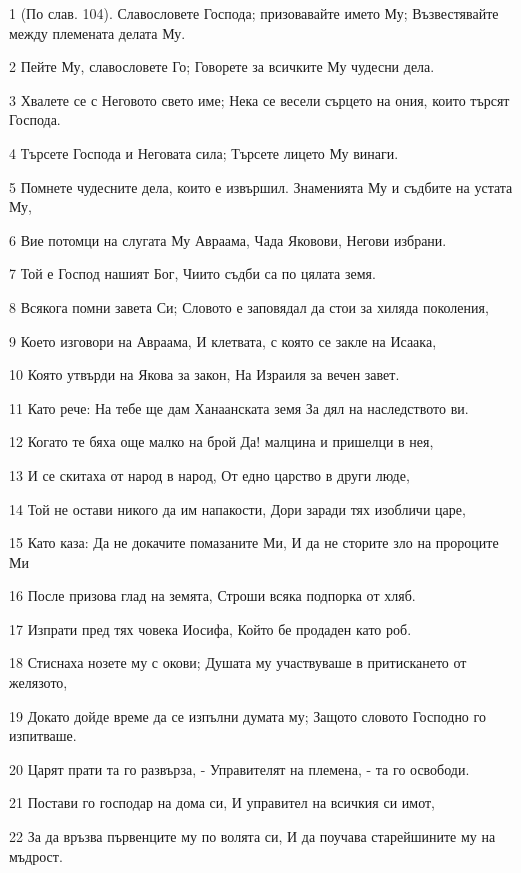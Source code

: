 \par 1 (По слав. 104). Славословете Господа; призовавайте името Му; Възвестявайте между племената делата Му.
\par 2 Пейте Му, славословете Го; Говорете за всичките Му чудесни дела.
\par 3 Хвалете се с Неговото свето име; Нека се весели сърцето на ония, които търсят Господа.
\par 4 Търсете Господа и Неговата сила; Търсете лицето Му винаги.
\par 5 Помнете чудесните дела, които е извършил. Знаменията Му и съдбите на устата Му,
\par 6 Вие потомци на слугата Му Авраама, Чада Яковови, Негови избрани.
\par 7 Той е Господ нашият Бог, Чиито съдби са по цялата земя.
\par 8 Всякога помни завета Си; Словото е заповядал да стои за хиляда поколения,
\par 9 Което изговори на Авраама, И клетвата, с която се закле на Исаака,
\par 10 Която утвърди на Якова за закон, На Израиля за вечен завет.
\par 11 Като рече: На тебе ще дам Ханаанската земя За дял на наследството ви.
\par 12 Когато те бяха още малко на брой Да! малцина и пришелци в нея,
\par 13 И се скитаха от народ в народ, От едно царство в други люде,
\par 14 Той не остави никого да им напакости, Дори заради тях изобличи царе,
\par 15 Като каза: Да не докачите помазаните Ми, И да не сторите зло на пророците Ми
\par 16 После призова глад на земята, Строши всяка подпорка от хляб.
\par 17 Изпрати пред тях човека Иосифа, Който бе продаден като роб.
\par 18 Стиснаха нозете му с окови; Душата му участвуваше в притискането от желязото,
\par 19 Докато дойде време да се изпълни думата му; Защото словото Господно го изпитваше.
\par 20 Царят прати та го развърза, - Управителят на племена, - та го освободи.
\par 21 Постави го господар на дома си, И управител на всичкия си имот,
\par 22 За да връзва първенците му по волята си, И да поучава старейшините му на мъдрост.
